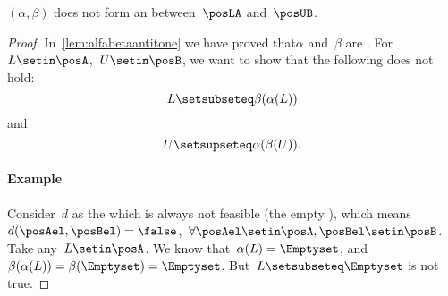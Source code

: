 {%

\begin{lemma}\label{lem:alpha-beta-not-antitone}
    $(\alpha, \beta)$ does not form an  between~$\posLA$ and~$\posUB$.
\end{lemma}
\begin{proof}
    In~\cref{lem:alfabetaantitone} we have proved that$\alpha$ and~$\beta$ are .
    For~$L\setin \posA$,~$U\setin \posB$, we want to show that the following does not hold:
    \begin{equation}
        \label{eq:alfabetafirst}
        L\setsubseteq \beta(\alpha(L))
    \end{equation}
    and
    \begin{equation}
        \label{eq:alfabetasec}
        U\setsupseteq \alpha(\beta(U)).
    \end{equation}

    \paragraph{Example}
    Consider~$d$ as the  which is always not feasible (the empty ), which means~$d(\posAel,\posBel)=\false$,~$\forall \posAel\setin \posA,\posBel\setin \posB$.
    Take any~$L\setin \posA$.
    We know that~$\alpha(L)=\Emptyset$, and~$\beta(\alpha(L))=\beta(\Emptyset)=\Emptyset$.
    But~$L\setsubseteq \Emptyset$ is not true.
\end{proof}

}